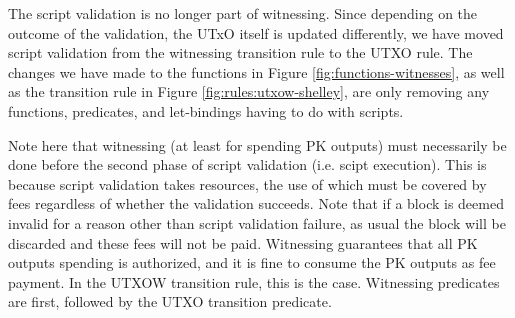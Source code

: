 The script validation is no longer part of witnessing. Since depending on
the outcome of the validation, the UTxO itself is updated differently, we
have moved script validation from the witnessing transition rule to
the UTXO rule. The changes we have made to the functions in Figure
\ref{fig:functions-witnesses}, as well as the transition rule in Figure
\ref{fig:rules:utxow-shelley}, are only removing any
functions, predicates, and let-bindings having to do with scripts.

Note here that witnessing (at least for spending PK outputs) must necessarily
be done before the second phase of script validation (i.e. scipt execution).
This is because script validation takes resources, the use of which must
be covered by fees regardless of whether the validation succeeds.
Note that if a block is deemed invalid for a reason other than
script validation failure, as usual the block will be discarded and
these fees will not be paid. Witnessing
guarantees that all PK outputs spending is authorized, and it is fine to
consume the PK outputs as fee payment. In the UTXOW transition rule,
this is the case. Witnessing predicates are first, followed by the UTXO transition
predicate.

